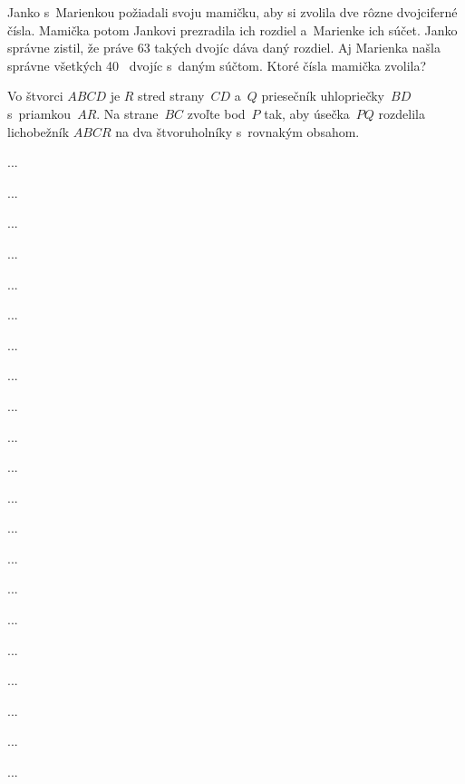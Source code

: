 {%
Janko s~Marienkou požiadali svoju mamičku, aby si zvolila dve rôzne
dvojciferné čísla. Mamička potom Jankovi prezradila ich rozdiel
a~Marienke ich súčet. Janko správne zistil, že práve 63 takých
dvojíc dáva daný rozdiel. Aj Marienka našla správne všetkých
40~ dvojíc s~daným súčtom. Ktoré čísla mamička zvolila?}

{%
Vo štvorci $ABCD$ je $R$ stred strany~$CD$ a~$Q$ priesečník
uhlopriečky~$BD$ s~priamkou~$AR$. Na strane~$BC$ zvoľte bod~$P$
tak, aby úsečka~$PQ$ rozdelila lichobežník $ABCR$ na dva
štvoruholníky s~rovnakým obsahom.}

{%
...}

{%
...}

{%
...}

{%
...}

{%
...}

{%
...}

{%
...}

{%
...}

{%
...}

{%
...}

{%
...}

{%
...}

{%
...}

{%
...}

{%
...}

{%
...}

{%
...}

{%
...}

{%
...}

{%
...}

{%
...}


